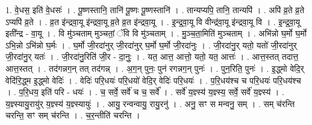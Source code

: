 \documentclass[17pt]{extarticle}
\begin{document}
1. वे॒धस॒ इति॑ वे॒धसः॑ । . पू॒ष्णस्तानि॒ तानि॑ पू॒ष्णः पू॒ष्णस्तानि॑ । . तान्यप्यपि॒ तानि॒ तान्यपि॑ । . अपि॑ व्र॒ते व्र॒ते ऽप्यपि॑ व्र॒ते । . व्र॒त इ॑न्द्रवा॒यू इ॑न्द्रवा॒यू व्र॒ते व्र॒त इ॑न्द्रवा॒यू । . इ॒न्द्र॒वा॒यू वि वीन्द्र॑वा॒यू इ॑न्द्रवा॒यू वि । . इ॒न्द्र॒वा॒यू इती᳚न्द्र - वा॒यू । . वि मु॑ञ्चताम् मुञ्चतां॒ ॅवि वि मु॑ञ्चताम् । . मु॒ञ्च॒ता॒मिति॑ मुञ्चताम् । . अभि॑न्नो घ॒र्मो घ॒र्मो ऽभि॒न्नो ऽभि॑न्नो घ॒र्मः । . घ॒र्मो जी॒रदा॑नुर् जी॒रदा॑नुर् घ॒र्मो घ॒र्मो जी॒रदा॑नुः । . जी॒रदा॑नु॒र् यतो॒ यतो॑ जी॒रदा॑नुर् जी॒रदा॑नु॒र् यतः॑ । . जी॒रदा॑नु॒रिति॑ जी॒र - दा॒नुः॒ । . यत॒ आत्त॒ आत्तो॒ यतो॒ यत॒ आत्तः॑ । . आत्त॒स्तत् तदात्त॒ आत्त॒स्तत् । . तद॑गन्नग॒न् तत् तद॑गन्न् । . अ॒ग॒न् पुनः॒ पुन॑ रगन्नग॒न् पुनः॑ । . पुन॒रिति॒ पुनः॑ । . इ॒द्ध्मो वेदि॒र् वेदि॑रि॒द्ध्म इ॒द्ध्मो वेदिः॑ । . वेदिः॑ परि॒धयः॑ परि॒धयो॑ वेदि॒र् वेदिः॑ परि॒धयः॑ । . प॒रि॒धय॑श्च च परि॒धयः॑ परि॒धय॑श्च । . प॒रि॒धय॒ इति॑ परि - धयः॑ । . च॒ सर्वे॒ सर्वे॑ च च॒ सर्वे᳚ । . सर्वे॑ य॒ज्ञ्स्य॑ य॒ज्ञ्स्य॒ सर्वे॒ सर्वे॑ य॒ज्ञ्स्य॑ । . य॒ज्ञ्स्यायु॒रायु॑र् य॒ज्ञ्स्य॑ य॒ज्ञ्स्यायुः॑ । . आयु॒ रन्वन्वायु॒ रायु॒रनु॑ । . अनु॒ सꣳ स मन्वनु॒ सम् । . सम् च॑रन्ति चरन्ति॒ सꣳ सम् च॑रन्ति । . च॒र॒न्तीति॑ चरन्ति । \newline
\end{document}
